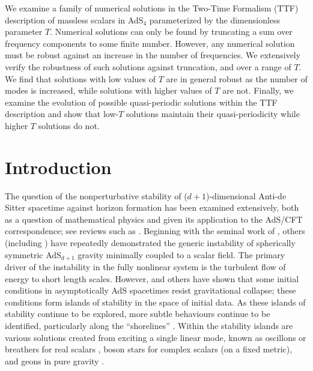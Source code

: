 \documentclass[../PhD.tex]{subfiles}
\begin{document}
We examine a family of numerical solutions in the Two-Time Formalism (TTF) description of massless scalars in AdS$_4$ parameterized by the dimensionless parameter $T$. Numerical solutions can only be found by truncating a sum over frequency components to some finite number. However, any numerical solution must be robust against an increase in the number of frequencies. We extensively verify the robustness of such solutions against truncation, and over a range of $T$. We find that solutions with low values of $T$ are in general robust as the number of modes is increased, while solutions with higher values of $T$ are not. Finally, we examine the evolution of possible quasi-periodic solutions within the TTF description and show that low-$T$ solutions maintain their quasi-periodicity while higher $T$ solutions do not.


\section{Introduction}

The question of the nonperturbative stability of ($d+1$)-dimensional Anti-de Sitter spacetime against horizon formation has been examined extensively, both as a question of mathematical physics and given its application to the AdS/CFT correspondence; see reviews such as \cite{1708.05600}. Beginning with the seminal work of \cite{1104.3702}, others (including \cite{1108.4539, 1106.2339, 1110.5823, 1210.0890, 1510.02592}) have repeatedly demonstrated the generic instability of spherically symmetric AdS$_{d+1}$ gravity minimally coupled to a scalar field. The primary driver of the instability in the fully nonlinear system is the turbulent flow of energy to short length scales. However, \cite{1303.3186, 1307.2875, 1403.5434} and others have shown that some initial conditions in asymptotically AdS spacetimes resist gravitational collapse; these conditions form islands of stability in the space of initial data. As these islands of stability continue to be explored, more subtle behaviours continue to be identified, particularly along the ``shorelines'' \cite{1508.02709, 1711.00454,1602.03535, 1803.02830}. Within the stability islands are various solutions created from exciting a single linear mode, known as oscillons or breathers for real scalars \cite{1104.3702,1210.0890,1303.3186,1503.07746}, boson stars for complex scalars (on a fixed metric)\cite{1304.4166,1307.2875}, and geons in pure gravity \cite{1109.1825,1208.5772}.
\end{document}

